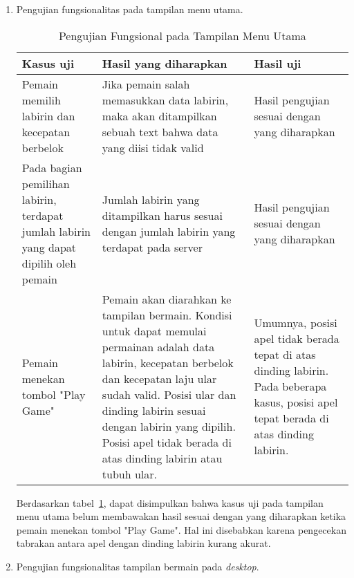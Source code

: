 \begin{enumerate}
	\item Pengujian fungsionalitas pada tampilan menu utama.
	
	\begin{table}[H]
		\caption{Pengujian Fungsional pada Tampilan Menu Utama} \label{tab:table1}
		\begin{tabular}{| m{4cm} | m{6cm}  | m{4cm} |}
			\hline
			Kasus uji & Hasil yang diharapkan & Hasil uji \\ \hline
			Pemain memilih labirin dan kecepatan berbelok & Jika pemain salah memasukkan data labirin, maka akan ditampilkan sebuah text bahwa data yang diisi tidak valid & Hasil pengujian sesuai dengan yang diharapkan\\ \hline
			Pada bagian pemilihan labirin, terdapat jumlah labirin yang dapat dipilih oleh pemain & Jumlah labirin yang ditampilkan harus sesuai dengan jumlah labirin yang terdapat pada server & Hasil pengujian sesuai dengan yang diharapkan\\ \hline
			Pemain menekan tombol "Play Game" & Pemain akan diarahkan ke tampilan bermain. Kondisi untuk dapat memulai permainan adalah data labirin, kecepatan berbelok dan kecepatan laju ular sudah valid. Posisi ular dan dinding labirin sesuai dengan labirin yang dipilih. Posisi apel tidak berada di atas dinding labirin atau tubuh ular. & Umumnya, posisi apel tidak berada tepat di atas dinding labirin. Pada beberapa kasus, posisi apel tepat berada di atas dinding labirin.\\ \hline
		\end{tabular}
	\end{table}
	
	Berdasarkan tabel~\ref{tab:table1}, dapat disimpulkan bahwa kasus uji pada tampilan menu utama belum membawakan hasil sesuai dengan yang diharapkan ketika pemain menekan tombol "Play Game". Hal ini disebabkan karena pengecekan tabrakan antara apel dengan dinding labirin kurang akurat. 
	
	\item Pengujian fungsionalitas tampilan bermain pada \textit{desktop}.
	

\end{enumerate}
